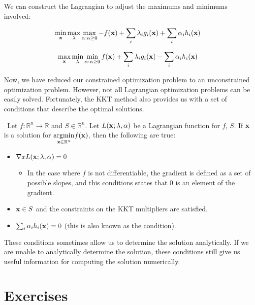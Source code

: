 \begin{remark}
We can construct the Lagrangian to adjust the maximums and minimums involved:

$$\min_{\vx} \max_{\vlambda} \max_{\valpha : \valpha \geq 0} -f(\vx) + \sum_{i} \vlambda_{i} g_{i}(\vx) + \sum_{i} \valpha_{i} h_{i}(\vx)$$

$$\max_{\vx} \min_{\vlambda} \min_{\valpha : \valpha \geq 0} f(\vx) + \sum_{i} \vlambda_{i} g_{i}(\vx) - \sum_{i} \valpha_{i} h_{i}(\vx)$$
\end{remark}

Now, we have reduced our constrained optimization problem to an unconstrained optimization problem. However, not all Lagrangian optimization problems can be easily solved. Fortunately, the KKT method also provides us with a set of conditions that describe the optimal solutions. 

\begin{theorem}\label{Karush-Kahn-Tucker Conditions}\
Let $f:\mathbb{R}^n \to \mathbb{R}$ and $S\in\mathbb{R}^n$. Let $L(\vx;\vlambda,\valpha)$ be a Lagrangian function for $f$, $S$. If $\vx$ is a solution for $\underset{\vx\in\mathbb{R}^n}{\argmin} f(\vx)$, then the following are true:
    \begin{itemize}
        \item $\nabla{x} L(\vx;\vlambda,\valpha) = 0$
        \begin{itemize}
            \item In the case where $f$ is not differentiable, the gradient is defined as a set of possible slopes, and this conditions states that $0$ is an element of the gradient.
        \end{itemize}
        \item $\vx \in S$ and the constraints on the KKT multipliers are satisfied.
        \item $\sum_{i} \alpha_{i} h_{i}(\vx)=0$ (this is also known as the  condition).
        \end{itemize}
\end{theorem}

These conditions sometimes allow us to determine the solution analytically. If we are unable to analytically determine the solution, these conditions still give us useful information for computing the solution numerically. 

\section{Exercises}

